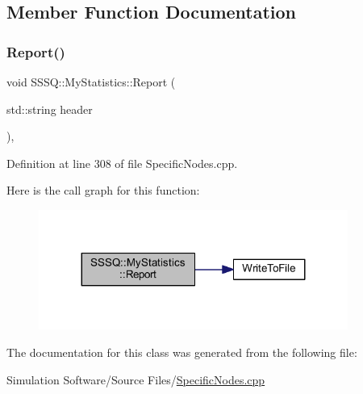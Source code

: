 \subsection{Member Function Documentation}
\mbox{\label{class_s_s_s_q_1_1_my_statistics_a6dec552109226c307ffbb81f45ec3eb9}} 
\subsubsection{\texorpdfstring{Report()}{Report()}}
{\footnotesize\ttfamily void S\+S\+S\+Q\+::\+My\+Statistics\+::\+Report (\begin{DoxyParamCaption}\item[{std\+::string}]{header }\end{DoxyParamCaption})\hspace{0.3cm}{\ttfamily [inline]}, {\ttfamily [override]}}



Definition at line 308 of file Specific\+Nodes.\+cpp.

Here is the call graph for this function\+:\nopagebreak
\begin{figure}[H]
\begin{center}
\leavevmode
\includegraphics[width=287pt]{class_s_s_s_q_1_1_my_statistics_a6dec552109226c307ffbb81f45ec3eb9_cgraph}
\end{center}
\end{figure}


The documentation for this class was generated from the following file\+:\begin{DoxyCompactItemize}
\item 
Simulation Software/\+Source Files/\hyperlink{_specific_nodes_8cpp}{Specific\+Nodes.\+cpp}\end{DoxyCompactItemize}
